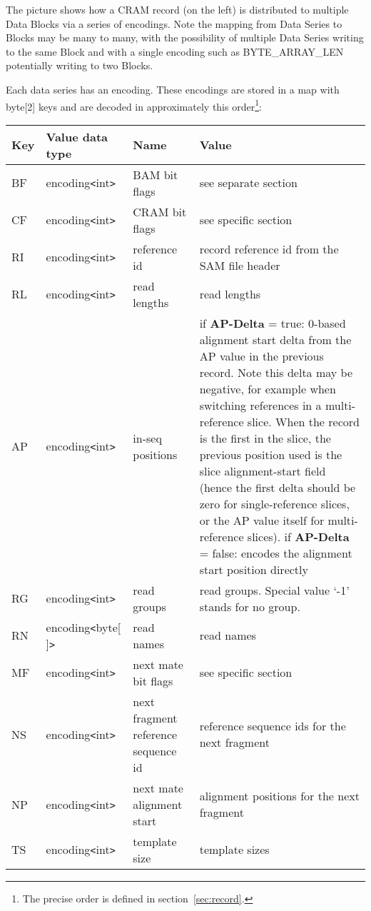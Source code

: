 \documentclass[a4paper]{article}
\begin{document}
The picture shows how a CRAM record (on the left) is distributed to
multiple Data Blocks via a series of encodings.  Note the mapping from
Data Series to Blocks may be many to many, with the possibility of
multiple Data Series writing to the same Block and with a single
encoding such as BYTE\_ARRAY\_LEN potentially writing to two Blocks.


Each data series has an encoding. These encodings are stored in a map with byte[2] 
keys and are decoded in approximately this order\footnote{The precise order is defined in section~\ref{sec:record}.}:

\begin{threeparttable}[t]
\begin{tabular}{|l|l|>{\raggedright}p{100pt}|>{\raggedright}p{220pt}|}
\hline
\textbf{Key} & \textbf{Value data type} & \textbf{Name} & \textbf{Value}\tabularnewline
\hline
BF & encoding\texttt{<}int\texttt{>} & BAM bit flags & see separate section\tabularnewline
\hline
CF & encoding\texttt{<}int\texttt{>} & CRAM bit flags & see specific section\tabularnewline
\hline
RI & encoding\texttt{<}int\texttt{>} & reference id & record reference id from
the SAM file header\tabularnewline
\hline
RL & encoding\texttt{<}int\texttt{>} & read lengths & read lengths\tabularnewline
\hline
AP & encoding\texttt{<}int\texttt{>} & in-seq positions & if \textbf{AP-Delta} = true: 0-based alignment start
delta from the AP value in the previous record.
Note this delta may be negative, for example when switching references in a multi-reference slice.
When the record is the first in the slice, the previous position used is the slice alignment-start field (hence the first delta should be zero for single-reference slices, or the AP value itself for multi-reference slices).  \linebreak{}
if \textbf{AP-Delta} = false: encodes the alignment start position directly\tabularnewline
\hline
RG & encoding\texttt{<}int\texttt{>} & read groups & read groups. Special value 
`-1' stands for no group.\tabularnewline
\hline
RN\tnote{a} & encoding\texttt{<}byte[ ]\texttt{>} & read names & read names\tabularnewline
\hline
MF & encoding\texttt{<}int\texttt{>} & next mate bit flags & see specific section\tabularnewline
\hline
NS & encoding\texttt{<}int\texttt{>} & next fragment reference sequence id & reference 
sequence ids for the next fragment \tabularnewline
\hline
NP & encoding\texttt{<}int\texttt{>} & next mate alignment start & alignment positions 
for the next fragment\tabularnewline
\hline
TS & encoding\texttt{<}int\texttt{>} & template size & template sizes\tabularnewline

\end{tabular}
\end{threeparttable}
\end{document}
